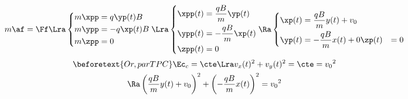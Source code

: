 \documentclass[a4paper, 10pt, final, garamond]{book}
\begin{document}
\begin{enumerate}[label=\sqenumi]
\begin{isd}
{\[\begin{array}{ll}
				\end{array}
			\]
			\begin{gather*}
				m\af = \Ff \Lra
				\left\{
				\begin{aligned}
					m\xpp & = q\yp(t)B  \\
					m\ypp & = -q\xp(t)B \\
					m\zpp & = 0
				\end{aligned}
				\right.
				\Lra
				\left\{
				\begin{aligned}
					\xpp(t) & = \frac{qB}{m}\yp(t)  \\
					\ypp(t) & = -\frac{qB}{m}\xp(t) \\
					\zpp(t) & = 0
				\end{aligned}
				\right.
				\Ra
				\left\{
				\begin{aligned}
					\xp(t) & = \frac{qB}{m}y(t) + v_0 \\
					\yp(t) & = -\frac{qB}{m}x(t) + 0
					\zp(t) & = 0
				\end{aligned}
				\right.
			\end{gather*}
		}
		\tcblower
		\begin{gather*}
			\beforetext{Or, par TPC}
			\Ec_c = \cte \Lra v_x(t)^2 + v_y(t)^2 = \cte = v_0{}^2
			\\\Ra
			\left(\frac{qB}{m}y(t) + v_0\right)^2 + \left(-\frac{qB}{m}x(t)\right)^2 =
			v_0{}^2
		\end{gather*}
	\end{isd}


\end{enumerate}
\end{document}
